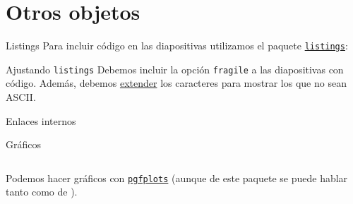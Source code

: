 \section{Otros objetos}

\begin{frame}{Listings}
  Para incluir código en las diapositivas utilizamos el paquete
  \href{https://www.ctan.org/tex-archive/macros/latex/contrib/listings}{\texttt{listings}}:
  \espacio
  \espacio
  \pause
  \begin{alertblock}{Ajustando \texttt{listings}}
    Debemos incluir la opción \texttt{fragile} a las diapositivas con código.
    Además, debemos \href{http://tex.stackexchange.com/questions/24528}{extender}
    los caracteres para mostrar los que no sean ASCII.
  \end{alertblock}
\end{frame}

\begin{frame}{Enlaces internos}

\end{frame}

\begin{frame}{Gráficos}
\begin{columns}[c]

   Podemos hacer gráficos con \href{https://ctan.org/pkg/pgfplots}{\texttt{pgfplots}} (aunque de este paquete se puede hablar tanto como de \beamer).
  \end{columns}
\end{frame}

